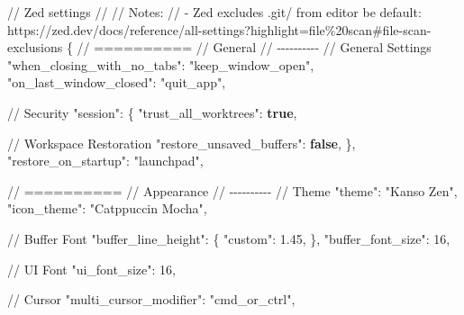 \documentclass[
  letterpaper,
  DIV=11,
  numbers=noendperiod]{scrreprt}
\newenvironment{Shaded}{\begin{snugshade}}{\end{snugshade}}
\newcommand{\DataTypeTok}[1]{\textcolor[rgb]{0.68,0.00,0.00}{#1}}
\newcommand{\DecValTok}[1]{\textcolor[rgb]{0.68,0.00,0.00}{#1}}
\newcommand{\ErrorTok}[1]{\textcolor[rgb]{0.68,0.00,0.00}{#1}}
\newcommand{\FloatTok}[1]{\textcolor[rgb]{0.68,0.00,0.00}{#1}}
\newcommand{\FunctionTok}[1]{\textcolor[rgb]{0.28,0.35,0.67}{#1}}
\newcommand{\KeywordTok}[1]{\textcolor[rgb]{0.00,0.23,0.31}{\textbf{#1}}}
\newcommand{\StringTok}[1]{\textcolor[rgb]{0.13,0.47,0.30}{#1}}
\begin{document}
\begin{codelisting}

\caption{\texttt{settings.json}}

\begin{Shaded}
\begin{Highlighting}[]
\ErrorTok{//} \ErrorTok{Zed} \ErrorTok{settings}
\ErrorTok{//}
\ErrorTok{//} \ErrorTok{Notes:}
\ErrorTok{//} \ErrorTok{{-}} \ErrorTok{Zed} \ErrorTok{excludes} \ErrorTok{\textasciigrave{}.git/\textasciigrave{}} \ErrorTok{from} \ErrorTok{editor} \ErrorTok{be} \ErrorTok{default:} \ErrorTok{https://zed.dev/docs/reference/all{-}settings?highlight=file\%20scan\#file{-}scan{-}exclusions}
\FunctionTok{\{}
  \ErrorTok{//} \ErrorTok{==========}
  \ErrorTok{//} \ErrorTok{General}
  \ErrorTok{//} \ErrorTok{{-}{-}{-}{-}{-}{-}{-}{-}{-}{-}}
  \ErrorTok{//} \ErrorTok{General} \ErrorTok{Settings}
  \DataTypeTok{"when\_closing\_with\_no\_tabs"}\FunctionTok{:} \StringTok{"keep\_window\_open"}\FunctionTok{,}
  \DataTypeTok{"on\_last\_window\_closed"}\FunctionTok{:} \StringTok{"quit\_app"}\FunctionTok{,}

  \ErrorTok{//} \ErrorTok{Security}
  \DataTypeTok{"session"}\FunctionTok{:} \FunctionTok{\{}
    \DataTypeTok{"trust\_all\_worktrees"}\FunctionTok{:} \KeywordTok{true}\FunctionTok{,}

    \ErrorTok{//} \ErrorTok{Workspace} \ErrorTok{Restoration}
    \DataTypeTok{"restore\_unsaved\_buffers"}\FunctionTok{:} \KeywordTok{false}\FunctionTok{,}
  \FunctionTok{\},}
  \DataTypeTok{"restore\_on\_startup"}\FunctionTok{:} \StringTok{"launchpad"}\FunctionTok{,}

  \ErrorTok{//} \ErrorTok{==========}
  \ErrorTok{//} \ErrorTok{Appearance}
  \ErrorTok{//} \ErrorTok{{-}{-}{-}{-}{-}{-}{-}{-}{-}{-}}
  \ErrorTok{//} \ErrorTok{Theme}
  \DataTypeTok{"theme"}\FunctionTok{:} \StringTok{"Kanso Zen"}\FunctionTok{,}
  \DataTypeTok{"icon\_theme"}\FunctionTok{:} \StringTok{"Catppuccin Mocha"}\FunctionTok{,}

  \ErrorTok{//} \ErrorTok{Buffer} \ErrorTok{Font}
  \DataTypeTok{"buffer\_line\_height"}\FunctionTok{:} \FunctionTok{\{}
    \DataTypeTok{"custom"}\FunctionTok{:} \FloatTok{1.45}\FunctionTok{,}
  \FunctionTok{\},}
  \DataTypeTok{"buffer\_font\_size"}\FunctionTok{:} \DecValTok{16}\FunctionTok{,}

  \ErrorTok{//} \ErrorTok{UI} \ErrorTok{Font}
  \DataTypeTok{"ui\_font\_size"}\FunctionTok{:} \DecValTok{16}\FunctionTok{,}

  \ErrorTok{//} \ErrorTok{Cursor}
  \DataTypeTok{"multi\_cursor\_modifier"}\FunctionTok{:} \StringTok{"cmd\_or\_ctrl"}\FunctionTok{,}


\end{Highlighting}
\end{Shaded}
\end{codelisting}
\end{document}
